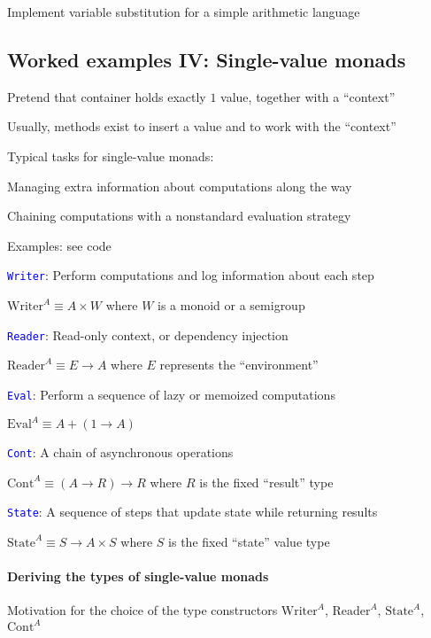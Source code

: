 Implement variable substitution for a simple arithmetic language


\subsection{Worked examples IV: Single-value monads}

Pretend that container holds exactly $1$ value, together with a ``context''

Usually, methods exist to insert a value and to work with the ``context''

Typical tasks for single-value monads:

Managing extra information about computations along the way

Chaining computations with a nonstandard evaluation strategy

Examples: see code

\texttt{\textcolor{blue}{\footnotesize{}Writer}}: Perform computations
and log information about each step

$\text{Writer}^{A}\equiv A\times W$ where $W$ is a monoid or a semigroup

\texttt{\textcolor{blue}{\footnotesize{}Reader}}: Read-only context,
or dependency injection

$\text{Reader}^{A}\equiv E\rightarrow A$ where $E$ represents the
``environment''

\texttt{\textcolor{blue}{\footnotesize{}Eval}}: Perform a sequence
of lazy or memoized computations

$\text{Eval}^{A}\equiv A+\left(1\rightarrow A\right)$

\texttt{\textcolor{blue}{\footnotesize{}Cont}}: A chain of asynchronous
operations

$\text{Cont}^{A}\equiv\left(A\rightarrow R\right)\rightarrow R$ where
$R$ is the fixed ``result'' type

\texttt{\textcolor{blue}{\footnotesize{}State}}: A sequence of steps
that update state while returning results

$\text{State}^{A}\equiv S\rightarrow A\times S$ where $S$ is the
fixed ``state'' value type


\paragraph{Deriving the types of single-value monads}

Motivation for the choice of the type constructors $\text{Writer}^{A}$,
$\text{Reader}^{A}$, $\text{State}^{A}$, $\text{Cont}^{A}$

